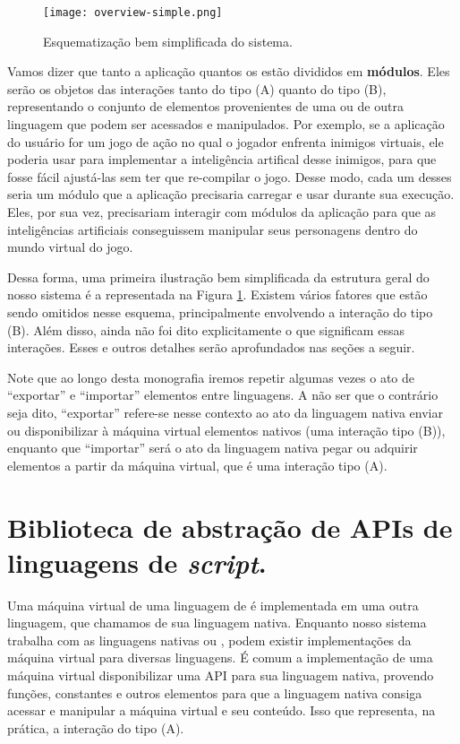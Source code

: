     \begin{figure}[ht]
      \centering
      \texttt{[image: overview-simple.png]}
      \caption{Esquematização bem simplificada do sistema.}
      \label{fig:overview-simple}
    \end{figure}

    Vamos dizer que tanto a aplicação quantos os  estão divididos
    em \textbf{módulos}. Eles serão os objetos das interações tanto do tipo (A)
    quanto do tipo (B), representando o conjunto de elementos provenientes de
    uma ou de outra linguagem que podem ser acessados e manipulados. Por
    exemplo, se a aplicação do usuário for um jogo de ação no qual o jogador
    enfrenta inimigos virtuais, ele poderia usar  para implementar a
    inteligência artifical desse inimigos, para que fosse fácil ajustá-las sem
    ter que re-compilar o jogo. Desse modo, cada um desses  seria um
    módulo que a aplicação precisaria carregar e usar durante sua execução.
    Eles, por sua vez, precisariam interagir com módulos da aplicação para que
    as inteligências artificiais conseguissem manipular seus personagens dentro
    do mundo virtual do jogo.

    Dessa forma, uma primeira ilustração bem simplificada da estrutura geral do
    nosso sistema é a representada na Figura \ref{fig:overview-simple}. Existem
    vários fatores que estão sendo omitidos nesse esquema, principalmente
    envolvendo a interação do tipo (B). Além disso, ainda não foi dito
    explicitamente o que significam essas interações. Esses e outros detalhes
    serão aprofundados nas seções a seguir.
    
    Note que ao longo desta monografia iremos repetir algumas vezes o ato de
    ``exportar'' e ``importar'' elementos entre linguagens. A não ser que o
    contrário seja dito, ``exportar'' refere-se nesse contexto ao ato da
    linguagem nativa enviar ou disponibilizar à máquina virtual elementos
    nativos (uma interação tipo (B)), enquanto que ``importar'' será o ato
    da linguagem nativa pegar ou adquirir elementos a partir da máquina virtual,
    que é uma interação tipo (A).

  \section{Biblioteca de abstração de APIs de linguagens de \emph{script}.}
  \label{sec:estrutura:opa}
  
    Uma máquina virtual de uma linguagem de \script{} é implementada em uma outra
    linguagem, que chamamos de sua linguagem nativa. Enquanto nosso sistema trabalha
    com as linguagens nativas \C{} ou \CXX{}, podem existir implementações da máquina
    virtual para diversas linguagens. É comum a implementação de uma máquina virtual
    disponibilizar uma API para sua linguagem nativa, provendo funções, constantes
    e outros elementos para que a linguagem nativa consiga acessar e manipular a
    máquina virtual e seu conteúdo. Isso que representa, na prática, a interação do
    tipo (A).

